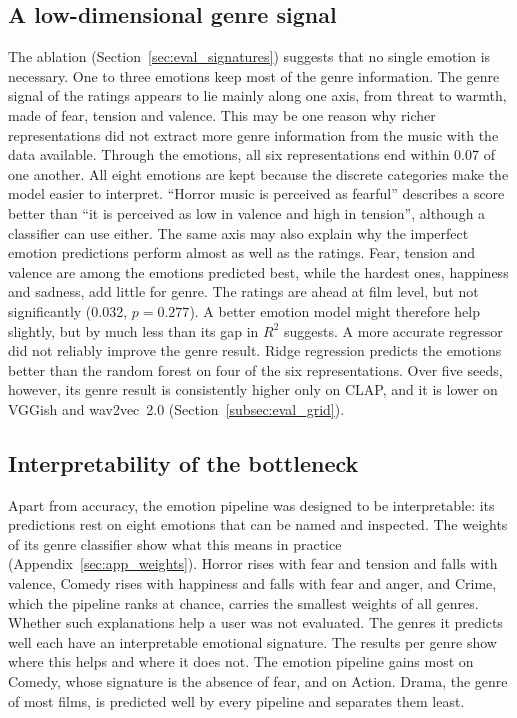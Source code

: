 \subsection{A low-dimensional genre signal}
\label{subsec:disc_ablation}

The ablation (Section~\ref{sec:eval_signatures}) suggests that no single emotion is necessary.
One to three emotions keep most of the genre information. The genre signal of the ratings
appears to lie mainly along one axis, from threat to warmth, made of fear, tension and valence.
This may be one reason why richer representations did not extract more genre information from the music with the
data available. Through the emotions, all six representations end within 0.07 of one
another. All eight emotions are kept because the discrete categories make the model easier
to interpret. ``Horror music is perceived as fearful'' describes a score better than ``it is perceived as low in valence and high in tension'', although a classifier can use either. The same axis may also explain why the imperfect
emotion predictions perform almost as well as the ratings. Fear, tension and valence are among
the emotions predicted best, while the hardest ones, happiness and sadness, add little for
genre. The ratings are ahead at film level, but not significantly (0.032, $p=0.277$). A
better emotion model might therefore help slightly, but by much less than its gap in $R^2$
suggests. A more accurate regressor did not reliably improve the genre result. Ridge regression predicts the
emotions better than the random forest on four of the six representations. Over five
seeds, however, its genre result is consistently higher only on CLAP, and it is lower on
VGGish and wav2vec~2.0 (Section~\ref{subsec:eval_grid}).

\subsection{Interpretability of the bottleneck}

Apart from accuracy, the emotion pipeline was designed to be interpretable: its predictions rest on eight emotions that can be named and inspected. The weights of its genre classifier show what this means in practice (Appendix~\ref{sec:app_weights}). Horror rises with fear and tension and falls with valence, Comedy rises with happiness and falls with fear and anger, and Crime, which the pipeline ranks at chance, carries the smallest weights of all genres. Whether such explanations help a user was not evaluated. The genres it predicts well each have an interpretable emotional signature. The results per genre
show where this helps and where it does not. The emotion pipeline gains most on Comedy,
whose signature is the absence of fear, and on Action. Drama, the genre of most films, is
predicted well by every pipeline and separates them least. 

